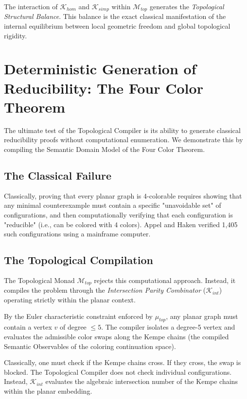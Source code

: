 \documentclass[12pt,openany]{extbook}
\theoremstyle{plain}
\theoremstyle{definition}
\begin{document}
The interaction of $\mathcal{K}_{hom}$ and $\mathcal{K}_{simp}$ within $\mathcal{M}_{top}$ generates the \emph{Topological Structural Balance}. This balance is the exact classical manifestation of the internal equilibrium between local geometric freedom and global topological rigidity.

\section{Deterministic Generation of Reducibility: The Four Color Theorem}

The ultimate test of the Topological Compiler is its ability to generate classical reducibility proofs without computational enumeration. We demonstrate this by compiling the Semantic Domain Model of the Four Color Theorem.

\subsection{The Classical Failure}
Classically, proving that every planar graph is 4-colorable requires showing that any minimal counterexample must contain a specific "unavoidable set" of configurations, and then computationally verifying that each configuration is "reducible" (i.e., can be colored with 4 colors). Appel and Haken verified 1,405 such configurations using a mainframe computer. 

\subsection{The Topological Compilation}
The Topological Monad $\mathcal{M}_{top}$ rejects this computational approach. Instead, it compiles the problem through the \emph{Intersection Parity Combinator} ($\mathcal{K}_{int}$) operating strictly within the planar context.

By the Euler characteristic constraint enforced by $\mu_{top}$, any planar graph must contain a vertex $v$ of degree $\leq 5$. The compiler isolates a degree-5 vertex and evaluates the admissible color swaps along the Kempe chains (the compiled Semantic Observables of the coloring continuation space).

Classically, one must check if the Kempe chains cross. If they cross, the swap is blocked. The Topological Compiler does not check individual configurations. Instead, $\mathcal{K}_{int}$ evaluates the algebraic intersection number of the Kempe chains within the planar embedding. 
\end{document}
